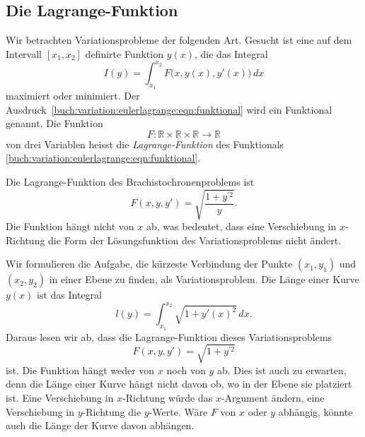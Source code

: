 %
%
%

%
%
\subsection{Die Lagrange-Funktion
\label{buch:variation:eulerlagrange:subsection:lagrange-funktion}}
Wir betrachten Variationsprobleme der folgenden Art.
Gesucht ist eine auf dem Intervall $[x_1,x_2]$ definirte
Funktion $y(x)$, die das Integral
\begin{equation}
I(y)
=
\int_{x_1}^{x_2}
F\bigl(x, y(x), y'(x)\bigr)
\,dx
\label{buch:variation:eulerlagrange:eqn:funktional}
\end{equation}
maximiert oder minimiert.
Der Ausdruck~\eqref{buch:variation:eulerlagrange:eqn:funktional}
wird ein Funktional genannt.
Die Funktion
\[
F
\colon
\mathbb{R}\times
\mathbb{R}\times
\mathbb{R}
\to
\mathbb{R}
\]
von drei Variablen heisst die {\em Lagrange-Funktion}
des Funktionals \eqref{buch:variation:eulerlagrange:eqn:funktional}.

\begin{beispiel}
Die Lagrange-Funktion des Brachistochronenproblems ist
\[
F(x,y,y')
=
\sqrt{ \frac{1+y^{\prime 2}}{y} }.
\]
Die Funktion hängt nicht von $x$ ab, was bedeutet, dass eine
Verschiebung in $x$-Richtung die Form der Lösungsfunktion des
Variationsproblems nicht ändert.
\end{beispiel}

\begin{beispiel}
\label{buch:variation:eulerlagrange:beispiel:gerade}
Wir formulieren die Aufgabe, die kürzeste Verbindung der Punkte
$(x_1,y_1)$ und $(x_2,y_2)$ in einer Ebene zu finden, als Variationsproblem.
Die Länge einer Kurve $y(x)$ ist das Integral
\[
l(y)
=
\int_{x_1}^{x_2}
\sqrt{1+y'(x)^2}\,dx.
\]
Daraus lesen wir ab, dass die Lagrange-Funktion dieses Variationsproblems
\begin{equation}
F(x,y,y') = \sqrt{1+y^{\prime 2}}
\label{buch:variation:eulerlagrange:eqn:geradeL}
\end{equation}
ist.
Die Funktion hängt weder von $x$ noch von $y$ ab.
Dies ist auch zu erwarten, denn die Länge einer Kurve hängt nicht davon
ob, wo in der Ebene sie platziert ist.
Eine Verschiebung in $x$-Richtung würde das $x$-Argument ändern,
eine Verschiebung in $y$-Richtung die $y$-Werte.
Wäre $F$ von $x$ oder $y$ abhängig, könnte auch die Länge der Kurve
davon abhängen.
\end{beispiel}

